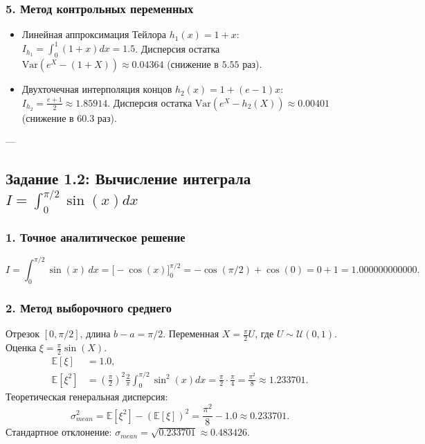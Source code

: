 \documentclass[11pt,a4paper]{article}
\begin{document}
\subsubsection{5. Метод контрольных переменных}
\begin{itemize}
    \item Линейная аппроксимация Тейлора $h_1(x) = 1 + x$: $I_{h_1} = \int_0^1 (1 + x)dx = 1.5$.
    Дисперсия остатка $\mathrm{Var}(e^X - (1+X)) \approx 0.04364$ (снижение в $5.55$ раз).
    \item Двухточечная интерполяция концов $h_2(x) = 1 + (e - 1)x$: $I_{h_2} = \frac{e + 1}{2} \approx 1.85914$.
    Дисперсия остатка $\mathrm{Var}(e^X - h_2(X)) \approx 0.00401$ (снижение в $60.3$ раз).
\end{itemize}

---

\subsection{Задание 1.2: Вычисление интеграла $I = \int_0^{\pi/2} \sin(x) dx$}

\subsubsection{1. Точное аналитическое решение}
\begin{equation}
    I = \int_{0}^{\pi/2} \sin(x)\,dx = \Big[ -\cos(x) \Big]_0^{\pi/2} = -\cos(\pi/2) + \cos(0) = 0 + 1 = 1.000000000000.
\end{equation}

\subsubsection{2. Метод выборочного среднего}
Отрезок $[0, \pi/2]$, длина $b - a = \pi/2$. Переменная $X = \frac{\pi}{2}U$, где $U \sim \mathcal{U}(0,1)$. Оценка $\xi = \frac{\pi}{2}\sin(X)$.
\begin{align}
    \mathbb{E}[\xi] &= 1.0, \\
    \mathbb{E}[\xi^2] &= \left(\frac{\pi}{2}\right)^2 \frac{2}{\pi} \int_0^{\pi/2} \sin^2(x) dx = \frac{\pi}{2} \cdot \frac{\pi}{4} = \frac{\pi^2}{8} \approx 1.233701.
\end{align}
Теоретическая генеральная дисперсия:
\begin{equation}
    \sigma^2_{mean} = \mathbb{E}[\xi^2] - (\mathbb{E}[\xi])^2 = \frac{\pi^2}{8} - 1.0 \approx 0.233701.
\end{equation}
Стандартное отклонение: $\sigma_{mean} = \sqrt{0.233701} \approx 0.483426$.
\end{document}
